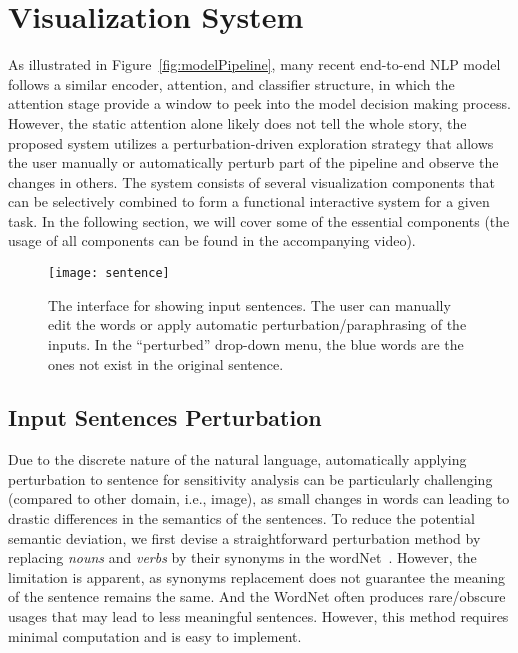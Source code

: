
\section{Visualization System}
As illustrated in Figure~\ref{fig:modelPipeline}, many recent end-to-end NLP model follows a similar encoder, attention, and classifier structure, in which the attention stage provide a window to peek into the model decision making process. 
However, the static attention alone likely does not tell the whole story, 
the proposed system utilizes a perturbation-driven exploration strategy that allows the user manually or automatically perturb part of the pipeline and observe the changes in others.
%
The system consists of several visualization components that can be selectively combined to form a functional interactive system for a given task. In the following section, we will cover some of the essential components (the usage of all components can be found in the accompanying video).

\begin{figure}[htbp]
\centering
\vspace{-2mm}
 \texttt{[image: sentence]}
 \vspace{-2mm}
 \caption{
The interface for showing input sentences. The user can manually edit the words or apply automatic perturbation/paraphrasing of the inputs. In the ``perturbed'' drop-down menu, the blue words are the ones not exist in the original sentence.
 }
 \vspace{-1mm}
\label{fig:sentence}
\end{figure}

\subsection{Input Sentences Perturbation}
\label{sec:perturb}
Due to the discrete nature of the natural language, automatically applying perturbation to sentence for sensitivity analysis can be particularly challenging (compared to other domain, i.e., image), as small changes in words can leading to drastic differences in the semantics of the sentences.
To reduce the potential semantic deviation, we first devise a straightforward perturbation method by replacing \emph{nouns} and \emph{verbs} by their synonyms in the wordNet~\cite{Miller1995}. However, the limitation is apparent, as synonyms replacement does not guarantee the meaning of the sentence remains the same. And the WordNet often produces rare/obscure usages that may lead to less meaningful sentences. However, this method requires minimal computation and is easy to implement. 

